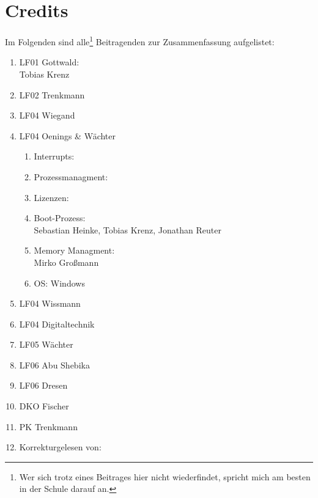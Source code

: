 \section{Credits}
Im Folgenden sind alle\footnote{Wer sich trotz eines Beitrages hier nicht wiederfindet, spricht mich am besten in der Schule darauf an.} Beitragenden zur Zusammenfassung aufgelistet:

\begin{enumerate}
	\item LF01 Gottwald:\\
Tobias Krenz
	\item LF02 Trenkmann
	\item LF04 Wiegand
	\item LF04 Oenings \& Wächter
	\begin{enumerate}
		\item Interrupts:
		\item Prozessmanagment:
		\item Lizenzen:
		\item Boot-Prozess:\\
Sebastian Heinke, Tobias Krenz, Jonathan Reuter
		\item Memory Managment:\\
Mirko Großmann
		\item OS: Windows
	\end{enumerate}
	\item LF04 Wissmann
	\item LF04 Digitaltechnik
	\item LF05 Wächter
	\item LF06 Abu Shebika
	\item LF06 Dresen
	\item DKO Fischer
	\item PK Trenkmann
	\item Korrekturgelesen von:
\end{enumerate}